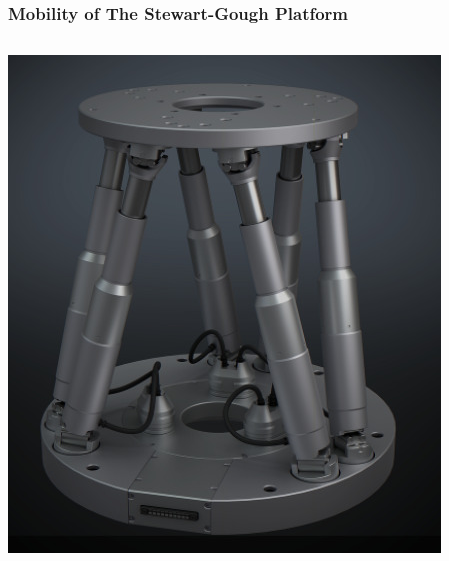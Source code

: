 \begin{frame}
	\frametitle{Mobility of The Stewart-Gough Platform}
	\centering 
	\begin{columns}
		\begin{column}{.4\linewidth}
			\includegraphics[width=\textwidth]{figures/stewart_spherical.jpg}
		\end{column}
		\begin{column}{.25\linewidth}

\end{column}
\end{columns}
\end{frame}
